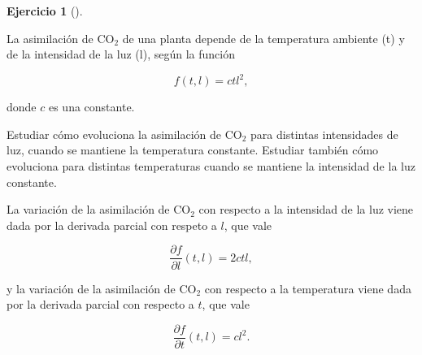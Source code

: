 \documentclass[
  a4paper,
]{scrreport}
\theoremstyle{definition}
\newtheorem{exercise}{Ejercicio}[chapter]
\theoremstyle{remark}
\begin{document}
\begin{exercise}[]\protect\hypertarget{exr-co2-planta}{}\label{exr-co2-planta}

La asimilación de CO\(_2\) de una planta depende de la temperatura
ambiente (t) y de la intensidad de la luz (l), según la función

\[
f(t,l) = ctl^2,
\]

donde \(c\) es una constante.

Estudiar cómo evoluciona la asimilación de CO\(_2\) para distintas
intensidades de luz, cuando se mantiene la temperatura constante.
Estudiar también cómo evoluciona para distintas temperaturas cuando se
mantiene la intensidad de la luz constante.

\end{exercise}

\begin{tcolorbox}[enhanced jigsaw, coltitle=black, toptitle=1mm, colframe=quarto-callout-tip-color-frame, colbacktitle=quarto-callout-tip-color!10!white, breakable, opacityback=0, bottomtitle=1mm, opacitybacktitle=0.6, title=\textcolor{quarto-callout-tip-color}{\faLightbulb}\hspace{0.5em}{Solución}, arc=.35mm, leftrule=.75mm, toprule=.15mm, titlerule=0mm, bottomrule=.15mm, left=2mm, rightrule=.15mm, colback=white]

La variación de la asimilación de CO\(_2\) con respecto a la intensidad
de la luz viene dada por la derivada parcial con respeto a \(l\), que
vale

\[
\frac{\partial f}{\partial l}(t,l) = 2ctl,
\]

y la variación de la asimilación de CO\(_2\) con respecto a la
temperatura viene dada por la derivada parcial con respecto a \(t\), que
vale

\[
\frac{\partial f}{\partial t}(t,l) = cl^2.
\]

\end{tcolorbox}
\end{document}
